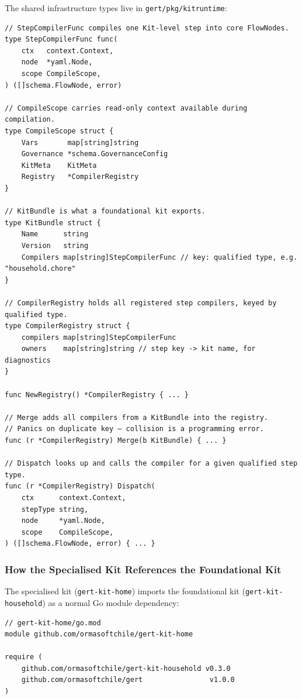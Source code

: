 The shared infrastructure types live in
\texttt{gert/pkg/kitruntime}:

\begin{verbatim}
// StepCompilerFunc compiles one Kit-level step into core FlowNodes.
type StepCompilerFunc func(
    ctx   context.Context,
    node  *yaml.Node,
    scope CompileScope,
) ([]schema.FlowNode, error)

// CompileScope carries read-only context available during compilation.
type CompileScope struct {
    Vars       map[string]string
    Governance *schema.GovernanceConfig
    KitMeta    KitMeta
    Registry   *CompilerRegistry
}

// KitBundle is what a foundational kit exports.
type KitBundle struct {
    Name      string
    Version   string
    Compilers map[string]StepCompilerFunc // key: qualified type, e.g. "household.chore"
}

// CompilerRegistry holds all registered step compilers, keyed by qualified type.
type CompilerRegistry struct {
    compilers map[string]StepCompilerFunc
    owners    map[string]string // step key -> kit name, for diagnostics
}

func NewRegistry() *CompilerRegistry { ... }

// Merge adds all compilers from a KitBundle into the registry.
// Panics on duplicate key — collision is a programming error.
func (r *CompilerRegistry) Merge(b KitBundle) { ... }

// Dispatch looks up and calls the compiler for a given qualified step type.
func (r *CompilerRegistry) Dispatch(
    ctx      context.Context,
    stepType string,
    node     *yaml.Node,
    scope    CompileScope,
) ([]schema.FlowNode, error) { ... }
\end{verbatim}

\subsubsection{How the Specialised Kit References the Foundational Kit}

The specialised kit (\texttt{gert-kit-home}) imports the foundational kit
(\texttt{gert-kit-household}) as a normal Go module dependency:

\begin{verbatim}
// gert-kit-home/go.mod
module github.com/ormasoftchile/gert-kit-home

require (
    github.com/ormasoftchile/gert-kit-household v0.3.0
    github.com/ormasoftchile/gert                v1.0.0
)
\end{verbatim}

